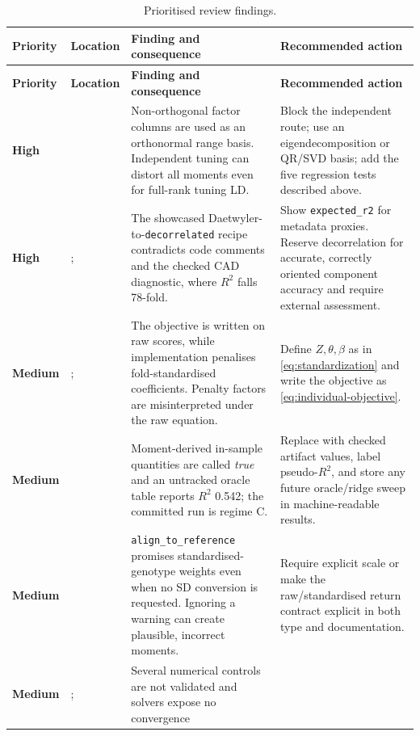 \documentclass[10pt,a4paper]{article}
\newcommand{\code}[1]{\texttt{#1}}
\newcommand{\Rtwo}{\(R^2\)}
\newcommand{\finding}[2]{\textbf{\textcolor{#1}{#2}}}
\begin{document}
\begin{longtable}{@{}L{15mm}L{39mm}L{48mm}L{54mm}@{}}
\caption{Prioritised review findings.}
\label{tab:findings}\\
\toprule
\textbf{Priority} & \textbf{Location} & \textbf{Finding and consequence} &
\textbf{Recommended action} \\
\midrule
\endfirsthead
\toprule
\textbf{Priority} & \textbf{Location} & \textbf{Finding and consequence} &
\textbf{Recommended action} \\
\midrule
\endhead
\finding{Critical}{High} &
 &
Non-orthogonal factor columns are used as an orthonormal range basis.
Independent tuning can distort all moments even for full-rank tuning LD. &
Block the independent route; use an eigendecomposition or QR/SVD basis; add the
five regression tests described above. \\
\finding{Critical}{High} &
;  &
The showcased Daetwyler-to-\code{decorrelated} recipe contradicts code comments
and the checked CAD diagnostic, where \Rtwo{} falls 78-fold. &
Show \code{expected\_r2} for metadata proxies. Reserve decorrelation for
accurate, correctly oriented component accuracy and require external
assessment. \\
\finding{Amber}{Medium} &
;  &
The objective is written on raw scores, while implementation penalises
fold-standardised coefficients. Penalty factors are misinterpreted under the
raw equation. &
Define \(Z,\theta,\beta\) as in \cref{eq:standardization} and write the objective
as \cref{eq:individual-objective}. \\
\finding{Amber}{Medium} &
 &
Moment-derived in-sample quantities are called \emph{true} and an untracked
oracle table reports \Rtwo{} 0.542; the committed run is regime C. &
Replace with checked artifact values, label pseudo-\Rtwo{}, and store any
future oracle/ridge sweep in machine-readable results. \\
\finding{Amber}{Medium} &
 &
\code{align\_to\_reference} promises standardised-genotype weights even when no
SD conversion is requested. Ignoring a warning can create plausible,
incorrect moments. &
Require explicit scale or make the raw/standardised return contract explicit
in both type and documentation. \\
\finding{Amber}{Medium} &
;  &
Several numerical controls are not validated and solvers expose no convergence

\end{longtable}
\end{document}
